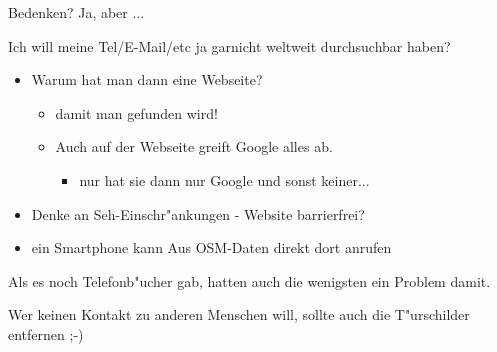\documentclass{beamer}
\begin{document}
\begin{frame}{Bedenken?}
Ja, aber ...

\vspace{0.3cm}

Ich will meine Tel/E-Mail/etc ja garnicht weltweit durchsuchbar haben?

\pause
\begin{itemize}
	  \item Warum hat man dann eine Webseite?
	  \begin{itemize}
	            \item damit man gefunden wird!
		    \item Auch auf der Webseite greift Google alles ab.
		     \begin{itemize}
                         \item nur hat sie dann nur Google und sonst keiner...
		 \end{itemize}
	\end{itemize}
	\pause
	\item Denke an Seh-Einschr"ankungen - Website barrierfrei?
	\item ein Smartphone kann Aus OSM-Daten direkt dort anrufen
\end{itemize}
Als es noch Telefonb"ucher gab, hatten auch die wenigsten ein Problem damit.

\vspace{0.3cm}

\pause
Wer keinen Kontakt zu anderen Menschen will, sollte auch die T"urschilder entfernen ;-)

\end{frame}
\end{document}
